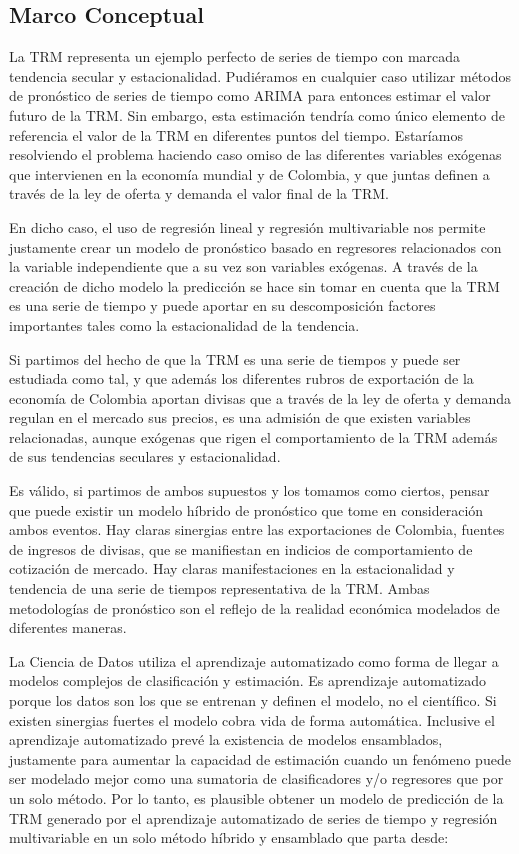 \subsection{Marco Conceptual}
La TRM representa un ejemplo perfecto de series de tiempo con marcada tendencia secular y estacionalidad. Pudiéramos en cualquier caso utilizar métodos de pronóstico de series de tiempo como ARIMA para entonces estimar el valor futuro de la TRM. Sin embargo, esta estimación tendría como único elemento de referencia el valor de la TRM en diferentes puntos del tiempo. Estaríamos resolviendo el problema haciendo caso omiso de las diferentes variables exógenas que intervienen en la economía mundial y de Colombia, y que juntas definen a través de la ley de oferta y demanda el valor final de la TRM.
 
En dicho caso, el uso de regresión lineal y regresión multivariable nos permite justamente crear un modelo de pronóstico basado en regresores relacionados con la variable independiente que a su vez son variables exógenas. A través de la creación de dicho modelo la predicción se hace sin tomar en cuenta que la TRM es una serie de tiempo y puede aportar en su descomposición factores importantes tales como la estacionalidad de la tendencia.
 
Si partimos del hecho de que la TRM es una serie de tiempos y puede ser estudiada como tal, y que además los diferentes rubros de exportación de la economía de Colombia aportan divisas que a través de la ley de oferta y demanda regulan en el mercado sus precios, es una admisión de que existen variables relacionadas, aunque exógenas que rigen el comportamiento de la TRM además de sus tendencias seculares y estacionalidad.
 
Es válido, si partimos de ambos supuestos y los tomamos como ciertos, pensar que puede existir un modelo híbrido de pronóstico que tome en consideración ambos eventos. Hay claras sinergias entre las exportaciones de Colombia, fuentes de ingresos de divisas, que se manifiestan en indicios de comportamiento de cotización de mercado. Hay claras manifestaciones en la estacionalidad y tendencia de una serie de tiempos representativa de la TRM. Ambas metodologías de pronóstico son el reflejo de la realidad económica modelados de diferentes maneras.
 
La Ciencia de Datos utiliza el aprendizaje automatizado como forma de llegar a modelos complejos de clasificación y estimación. Es aprendizaje automatizado porque los datos son los que se entrenan y definen el modelo, no el científico. Si existen sinergias fuertes el modelo cobra vida de forma automática. Inclusive el aprendizaje automatizado prevé la existencia de modelos ensamblados, justamente para aumentar la capacidad de estimación cuando un fenómeno puede ser modelado mejor como una sumatoria de clasificadores y/o regresores que por un solo método. Por lo tanto, es plausible obtener un modelo de predicción de la TRM generado por el aprendizaje automatizado de series de tiempo y regresión multivariable en un solo método híbrido y ensamblado que parta desde:
 
